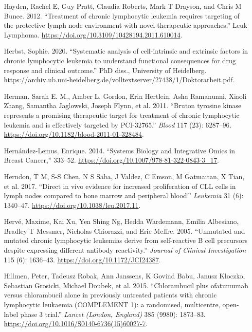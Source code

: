 \documentclass[11pt, a4paper, twosided]{book}
\newenvironment{CSLReferences}%
  {}%
  {\par}
\begin{document}
\begin{CSLReferences}{1}{0}
\leavevmode{}%
Hayden, Rachel E, Guy Pratt, Claudia Roberts, Mark T Drayson, and Chris M Bunce. 2012. {``{Treatment of chronic lymphocytic leukemia requires targeting of the protective lymph node environment with novel therapeutic approaches}.''} Leuk Lymphoma. \url{https://doi.org/10.3109/10428194.2011.610014}.

\leavevmode{}%
Herbst, Sophie. 2020. {``{Systematic analysis of cell-intrinsic and extrinsic factors in chronic lymphocytic leukemia to understand functional consequences for drug response and clinical outcome}.''} PhD diss., University of Heidelberg. \url{https://archiv.ub.uni-heidelberg.de/volltextserver/27438/1/Doktorarbeit.pdf}.

\leavevmode{}%
Herman, Sarah E. M., Amber L. Gordon, Erin Hertlein, Asha Ramanunni, Xiaoli Zhang, Samantha Jaglowski, Joseph Flynn, et al. 2011. {``{Bruton tyrosine kinase represents a promising therapeutic target for treatment of chronic lymphocytic leukemia and is effectively targeted by PCI-32765}.''} \emph{Blood} 117 (23): 6287--96. \url{https://doi.org/10.1182/blood-2011-01-328484}.

\leavevmode{}%
Hernández-Lemus, Enrique. 2014. {``{Systems Biology and Integrative Omics in Breast Cancer},''} 333--52. \url{https://doi.org/10.1007/978-81-322-0843-3_17}.

\leavevmode{}%
Herndon, T M, S-S Chen, N S Saba, J Valdez, C Emson, M Gatmaitan, X Tian, et al. 2017. {``{Direct in vivo evidence for increased proliferation of CLL cells in lymph nodes compared to bone marrow and peripheral blood}.''} \emph{Leukemia} 31 (6): 1340--47. \url{https://doi.org/10.1038/leu.2017.11}.

\leavevmode{}%
Hervé, Maxime, Kai Xu, Yen Shing Ng, Hedda Wardemann, Emilia Albesiano, Bradley T Messmer, Nicholas Chiorazzi, and Eric Meffre. 2005. {``{Unmutated and mutated chronic lymphocytic leukemias derive from self-reactive B cell precursors despite expressing different antibody reactivity}.''} \emph{Journal of Clinical Investigation} 115 (6): 1636--43. \url{https://doi.org/10.1172/JCI24387}.

\leavevmode{}%
Hillmen, Peter, Tadeusz Robak, Ann Janssens, K Govind Babu, Janusz Kloczko, Sebastian Grosicki, Michael Doubek, et al. 2015. {``{Chlorambucil plus ofatumumab versus chlorambucil alone in previously untreated patients with chronic lymphocytic leukaemia (COMPLEMENT 1): a randomised, multicentre, open-label phase 3 trial.}''} \emph{Lancet (London, England)} 385 (9980): 1873--83. \url{https://doi.org/10.1016/S0140-6736(15)60027-7}.


\end{CSLReferences}
\end{document}
